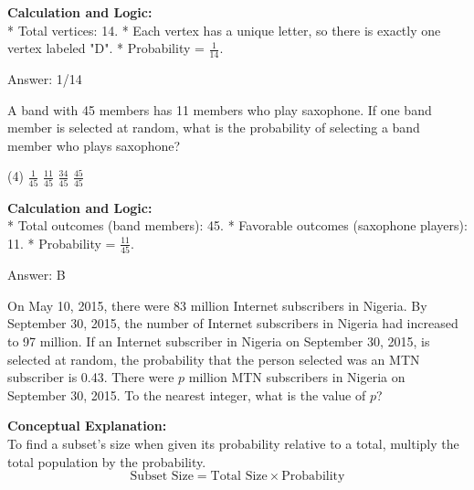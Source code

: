 \documentclass[11pt,paper=a4,answers]{exam}
\begin{document}
\begin{questions}
\begin{solution}
\textbf{Calculation and Logic:} \\
* Total vertices: 14.
* Each vertex has a unique letter, so there is exactly one vertex labeled "D".
* Probability = $\frac{1}{14}$.

\vspace{30pt}

Answer: \colorbox{yellow!100}{1/14}
\end{solution}

\vspace{60pt}

\question
A band with 45 members has 11 members who play saxophone. If one band member is selected at random, what is the probability of selecting a band member who plays saxophone?
\begin{tasks}(4)
    \task $\frac{1}{45}$
    \task $\frac{11}{45}$
    \task $\frac{34}{45}$
    \task $\frac{45}{45}$
\end{tasks}

\begin{solution}
\textbf{Calculation and Logic:} \\
* Total outcomes (band members): 45.
* Favorable outcomes (saxophone players): 11.
* Probability = $\frac{11}{45}$.

\vspace{30pt}

Answer: \colorbox{yellow!100}{B}
\end{solution}

\vspace{60pt}

\question
On May 10, 2015, there were 83 million Internet subscribers in Nigeria. By September 30, 2015, the number of Internet subscribers in Nigeria had increased to 97 million. If an Internet subscriber in Nigeria on September 30, 2015, is selected at random, the probability that the person selected was an MTN subscriber is 0.43. There were $p$ million MTN subscribers in Nigeria on September 30, 2015. To the nearest integer, what is the value of $p$?

\begin{solution}
\textbf{Conceptual Explanation:} \\
To find a subset's size when given its probability relative to a total, multiply the total population by the probability. 
\[ \text{Subset Size} = \text{Total Size} \times \text{Probability} \]


\end{solution}
\end{questions}
\end{document}
